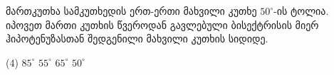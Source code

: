 მართკუთხა სამკუთხედის ერთ-ერთი მახვილი კუთხე \(50^{\circ}\)-ის ტოლია. იპოვეთ მართი კუთხის წვეროდან გავლებული ბისექტრისის მიერ ჰიპოტენუზასთან შედგენილი მახვილი კუთხის სიდიდე.

\vspace*{0.5cm}

\begin{tasks} (4)
    \task[ა)] \( 85 ^{\circ}\)
    \task[ბ)] \( 55 ^{\circ}\)
    \task[გ)] \( 65 ^{\circ}\)
    \task[დ)] \( 50 ^{\circ}\)
\end{tasks}